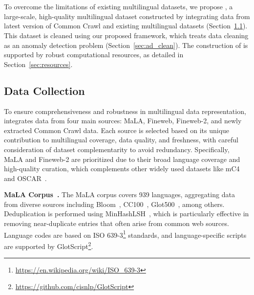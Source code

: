 \section{\dcad}
\label{sec:dcad-200}
To overcome the limitations of existing multilingual datasets, we propose \dcad, a large-scale, high-quality multilingual dataset constructed by integrating data from latest version of Common Crawl and existing multilingual datasets (Section~\ref{sec:data_collect}).
This dataset is cleaned using our proposed framework, which treats data cleaning as an anomaly detection problem (Section~\ref{sec:ad_clean}).
The construction of \dcad is supported by robust computational resources, as detailed in Section~\ref{sec:resources}.

\subsection{Data Collection}
\label{sec:data_collect}
To ensure comprehensiveness and robustness in multilingual data representation, \dcad integrates data from four main sources: MaLA, Fineweb, Fineweb-2, and newly extracted Common Crawl data.
Each source is selected based on its unique contribution to multilingual coverage, data quality, and freshness, with careful consideration of dataset complementarity to avoid redundancy.
Specifically, MaLA and Fineweb-2 are prioritized due to their broad language coverage and high-quality curation, which complements other widely used datasets like mC4~\cite{raffel2020exploring} and OSCAR~\cite{abadji2022towards}.

\textbf{MaLA Corpus~\cite{ji2024emma}.}
The MaLA corpus covers 939 languages, aggregating data from diverse sources including Bloom~\cite{leong-etal-2022-bloom}, CC100~\cite{conneau-etal-2020-unsupervised}, Glot500~\cite{imanigooghari-etal-2023-glot500}, among others.
Deduplication is performed using MinHashLSH~\cite{broder1998min}, which is particularly effective in removing near-duplicate entries that often arise from common web sources.
Language codes are based on ISO 639-3\footnote{\url{https://en.wikipedia.org/wiki/ISO_639-3}} standards, and language-specific scripts are supported by GlotScript\footnote{\url{https://github.com/cisnlp/GlotScript}}.

